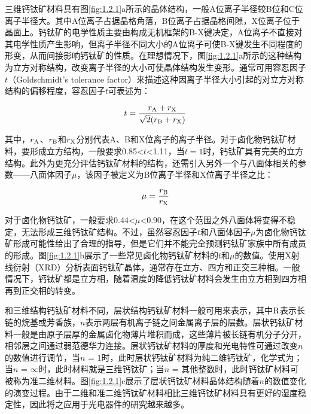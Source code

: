 \documentclass[forlib]{WHUMaster}   %
\begin{document}
{\songti{}三维钙钛矿材料具有图\ref{fig:1.2.1}a所示的晶体结构，一般A位离子半径较B位和C位离子半径大\cite{RN52}。其中A位离子占据晶格角落，B位离子占据晶格间隙，X位离子位于晶面上。钙钛矿的电学性质主要由构成无机框架的B-X键决定，A位离子不直接对其电学性质产生影响，但离子半径不同大小的A位离子可使B-X键发生不同程度的形变，从而间接影响钙钛矿的性质\cite{RN52,RN137}。在理想情况下，图\ref{fig:1.2.1}a所示的这种结构为立方对称结构\cite{RN52,RN55}，改变离子半径的大小可使晶体结构发生变形。通常可用容忍因子$t$（Goldschmidt's tolerance factor）来描述这种因离子半径大小引起的对立方对称结构的偏移程度\cite{RN54}，容忍因子$t$可表述为：


\begin{equation}\label{eq-1.1}
{t = \frac{r_{\rm{A}}+r_{\rm{X}}}{\sqrt{2}(r_{\rm{B}}+r_{\rm{X}})}}
\end{equation}

其中，$r_{\rm{A}}$、$r_{\rm{B}}$和$r_{\rm{X}}$分别代表A、B和X位离子的离子半径。对于卤化物钙钛矿材料，要形成立方结构，一般要求0.85<$t$<1.11\cite{RN55}，当$t = 1$时，钙钛矿具有完美的立方结构\cite{RN137}。此外为更充分评估钙钛矿材料的结构，还需引入另外一个与八面体相关的参数——八面体因子$\mu$，该因子被定义为B位离子半径和X位离子半径之比：

\begin{equation}\label{eq-1.2}
\mu = \frac{r_{\rm{B}}}{r_{\rm{X}}}
\end{equation}

对于卤化物钙钛矿，一般要求0.44<$\mu$<0.90\cite{RN56}，在这个范围之外八面体将变得不稳定，无法形成三维钙钛矿结构。不过，虽然容忍因子$t$和八面体因子$\mu$为卤化物钙钛矿形成可能性给出了合理的指导，但是它们并不能完全预测钙钛矿家族中所有成员的形成\cite{RN55}。图\ref{fig:1.2.1}b展示了一些常见卤化物钙钛矿材料的$t$和$\mu$的数值。使用X射线衍射（XRD）分析表面钙钛矿晶体，通常存在立方\iffalse（Pm3m）\fi、四方\iffalse（I4/mcm）\fi 和正交三种相\cite{RN57}。一般情况下，钙钛矿都是立方相，随着温度的降低钙钛矿材料会发生由立方相到四方相再到正交相的转变。\cite{RN52}%

和三维结构钙钛矿材料不同，层状结构钙钛矿材料一般可用来表示，其中${\rm{R}}$表示长链的烷基或芳香族，$n$表示两层有机离子链之间金属离子层的层数。层状钙钛矿材料一般是由原子层厚的金属卤化物薄片堆积而成，这些薄片被长链有机分子分开，相邻层之间通过弱范德华力连接。层状钙钛矿材料的厚度和光电特性可通过改变$n$的数值进行调节，当$n$ = 1时，此时层状钙钛矿材料为纯二维钙钛矿，化学式为；当$n$ = $\infty$时，此时材料就是三维钙钛矿；当$n$ = 其他整数时，此时钙钛矿材料可被称为准二维材料。图\ref{fig:1.2.1}c展示了层状钙钛矿材料晶体结构随着$n$的数值变化的演变过程。由于二维和准二维钙钛矿材料相比三维钙钛矿材料具有更好的湿度稳定性，因此将之应用于光电器件的研究越来越多\cite{RN135}。}
\end{document}
